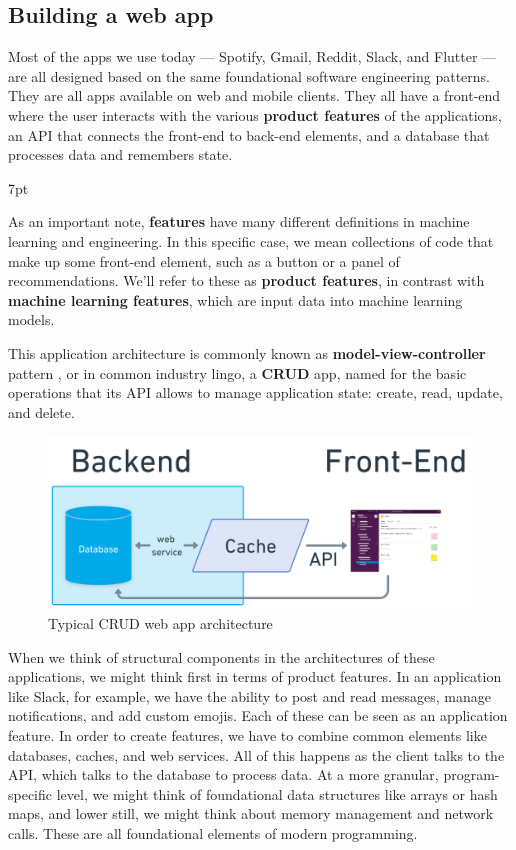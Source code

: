 \documentclass[11pt, table]{diazessay} %
\newenvironment{formal}{%
  \def\FrameCommand{%
    \hspace{1pt}%
    {\color{w_lightblue}\vrule width 2pt}%
    {\color{formalshade}\vrule width 4pt}%
    \colorbox{formalshade}%
  }%
  \MakeFramed{\advance\hsize-\width\FrameRestore}%
  \noindent\hspace{-4.55pt}%
  \begin{adjustwidth}{}{7pt}%
  \vspace{2pt}\vspace{2pt}%
}
{%
  \vspace{2pt}\end{adjustwidth}\endMakeFramed%
}
\begin{document}
\begin{sloppypar}
\subsection{Building a web app}

 Most of the apps we use today --- Spotify, Gmail, Reddit, Slack, and Flutter --- are all designed based on the same foundational software engineering patterns. They are all apps available on web and mobile clients. They all have a front-end where the user interacts with the various \textbf{product features} of the applications, an API that connects the front-end to back-end elements, and a database that processes data and remembers state. 
 
 \begin{formal}
 As an important note, \textbf{features} have many different definitions in machine learning and engineering. In this specific case, we mean collections of code that make up some front-end element, such as a button or a panel of recommendations. We'll refer to these as \textbf{product features}, in contrast with \textbf{machine learning features}, which are input data into machine learning models. 
  \end{formal}
 
 This application architecture is commonly known as \textbf{model-view-controller} pattern \citep{fowler2012patterns}, or in common industry lingo, a \textbf{CRUD} app, named for the basic operations that its API allows to manage application state: create, read, update, and delete. 
 
\begin{figure}[H]
\centering
\includegraphics[width=.9\textwidth]{figures/web_service.png}
\caption{Typical CRUD web app architecture}
\end{figure}

When we think of structural components in the architectures of these applications, we might think first in terms of product features. In an application like Slack, for example, we have the ability to post and read messages, manage notifications, and add custom emojis. Each of these can be seen as an application feature. In order to create features, we have to combine common elements like databases, caches, and web services. All of this happens as the client talks to the API, which talks to the database to process data. At a more granular, program-specific level, we might think of foundational data structures like arrays or hash maps, and lower still, we might think about memory management and network calls. These are all foundational elements of modern programming. 


\end{sloppypar}
\end{document}
